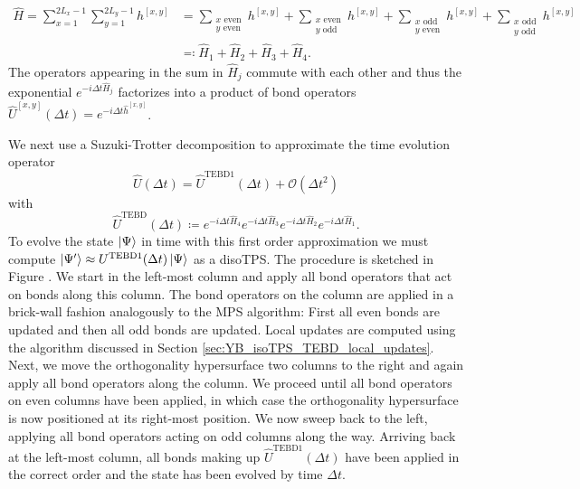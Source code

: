 \begin{equation}
	\label{eq:YB_isoTPS_TEBD_splitting_local_Hamiltonian}
	\begin{split}
		\hat{H} = \sum_{x=1}^{2L_x-1} \sum_{y=1}^{2L_y-1}h^{[x,y]} &= \sum_{\substack{x\text{ even}\\y\text{ even}}} h^{[x, y]} + \sum_{\substack{x\text{ even}\\y\text{ odd}}} h^{[x, y]} + \sum_{\substack{x\text{ odd}\\y\text{ even}}} h^{[x, y]} + \sum_{\substack{x\text{ odd}\\y\text{ odd}}} h^{[x, y]} \\
		&\eqqcolon \hat{H}_1 + \hat{H}_2 + \hat{H}_3 + \hat{H}_4.
	\end{split}
\end{equation}
The operators appearing in the sum in $\hat{H}_j$ commute with each other and thus the exponential $e^{-i\Delta t\hat{H}_j}$ factorizes into a product of bond operators $\hat{U}^{[x, y]}(\Delta t) = e^{-i\Delta t\hat{h}^{[x, y]}}$. \par
We next use a Suzuki-Trotter decomposition to approximate the time evolution operator
\begin{equation}
	\label{eq:YB_isoTPS_TEBD_suzuki_trotter_first_order}
	\hat{U}(\Delta t) = \hat{U}^\text{TEBD1}(\Delta t) + \mathcal{O}(\Delta t^2)
\end{equation}
with
\begin{equation}
	\label{eq:YB_isoTPS_TEBD_first_order_TEBD_operator}
	\hat{U}^\text{TEBD}(\Delta t) \coloneqq e^{-i\Delta t\hat{H}_4} e^{-i\Delta t\hat{H}_3} e^{-i\Delta t\hat{H}_2} e^{-i\Delta t\hat{H}_1}.
\end{equation}
To evolve the state $\ket{\Psi}$ in time with this first order approximation we must compute $\ket{\Psi^\prime} \approx U^\text{TEBD1}(\Delta t)\ket{\Psi}$ as a disoTPS. The procedure is sketched in Figure . We start in the left-most column and apply all bond operators that act on bonds along this column. The bond operators on the column are applied in a brick-wall fashion analogously to the MPS algorithm: First all even bonds are updated and then all odd bonds are updated. Local updates are computed using the algorithm discussed in Section \ref{sec:YB_isoTPS_TEBD_local_updates}. Next, we move the orthogonality hypersurface two columns to the right and again apply all bond operators along the column. We proceed until all bond operators on even columns have been applied, in which case the orthogonality hypersurface is now positioned at its right-most position. We now sweep back to the left, applying all bond operators acting on odd columns along the way. Arriving back at the left-most column, all bonds making up $\hat{U}^\text{TEBD1}(\Delta t)$ have been applied in the correct order and the state has been evolved by time $\Delta t$. \par
